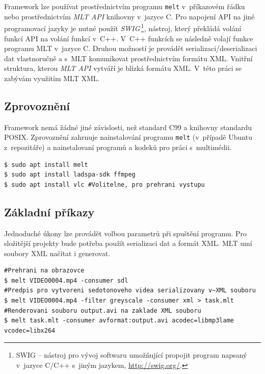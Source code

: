 Framework lze používat prostřednictvím programu \texttt{melt} v~příkazovém řádku nebo prostřednictvím \textit{MLT API} knihovny v~jazyce C. Pro napojení API na jiné programovací jazyky je nutné použít \textit{SWIG}\,\footnote{SWIG -- nástroj pro vývoj softwaru umožňující propojit program napsaný v~jazyce C/C++ s~jiným jazykem, \url{http://swig.org/}.}, nástroj, který překládá volání funkcí API na volání funkcí v~C++. V~C++ funkcích se následně volají funkce programu MLT v~jazyce C. Druhou možností je provádět serializaci/deserializaci dat vlastnoručně a s~MLT komunikovat prostřednictvím formátu XML. Vnitřní struktura, kterou \textit{MLT API} vytváří je blízká formátu XML. V~této práci se zabývám využitím MLT XML.

\subsection{Zprovoznění}
Framework nemá žádné jiné závislosti, než standard C99 a knihovny standardu POSIX. Zprovoznění zahrnuje nainstalování programu \texttt{melt} (v~případě Ubuntu z~repozitáře) a nainstalovaní programů a kodeků pro práci s~multimédii.
\begin{lstlisting}[style=bash]
$ sudo apt install melt
$ sudo apt install ladspa-sdk ffmpeg
$ sudo apt install vlc #Volitelne, pro prehrani vystupu
\end{lstlisting}

\subsection{Základní příkazy}
Jednoduché úkony lze provádět volbou parametrů při spuštění programu. Pro složitější projekty bude potřeba použít serializaci dat a formát XML. MLT umí soubory XML načítat i generovat.
\begin{lstlisting}[style=bash]
#Prehrani na obrazovce
$ melt VIDEO0004.mp4 -consumer sdl
#Predpis pro vytvoreni sedotonoveho videa serializovany v~XML souboru
$ melt VIDEO0004.mp4 -filter greyscale -consumer xml > task.mlt 
#Renderovani souboru output.avi na zaklade XML souboru
$ melt task.mlt -consumer avformat:output.avi acodec=libmp3lame vcodec=libx264
\end{lstlisting}
